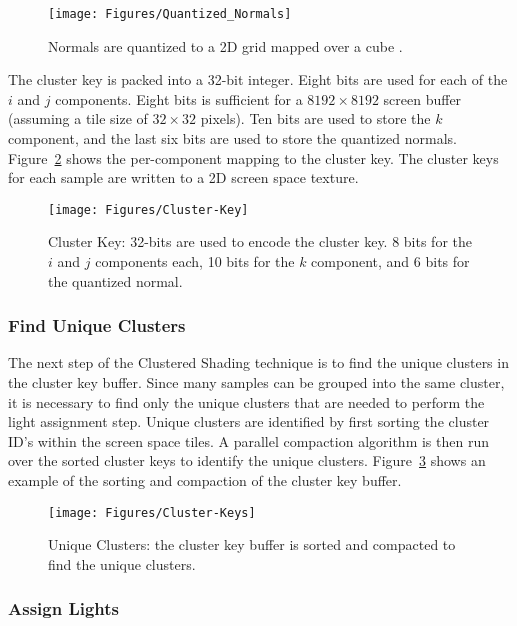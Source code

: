 \begin{figure}[h]
\centering
\texttt{[image: Figures/Quantized\_Normals]}
\decoRule
\caption[Quantized Normals]{Normals are quantized to a 2D grid mapped over a cube \parencite{20_olsson_2012}.}
\label{fig:Quantized_Normals}
\end{figure}

The cluster key is packed into a 32-bit integer. Eight bits are used for each of the $i$ and $j$ components. Eight bits is sufficient for a $8192 \times 8192$ screen buffer (assuming a tile size of $32 \times 32$ pixels). Ten bits are used to store the $k$ component, and the last six bits are used to store the quantized normals. Figure~\ref{fig:Cluster-Key} shows the per-component mapping to the cluster key. The cluster keys for each sample are written to a 2D screen space texture.

\begin{figure}[h]
\centering
\texttt{[image: Figures/Cluster-Key]}
\decoRule
\caption[Cluster Key]{Cluster Key: 32-bits are used to encode the cluster key. 8 bits for the $i$ and $j$ components each, 10 bits for the $k$ component, and 6 bits for the quantized normal.}
\label{fig:Cluster-Key}
\end{figure}

\subsubsection{Find Unique Clusters}

The next step of the Clustered Shading technique is to find the unique clusters in the cluster key buffer. Since many samples can be grouped into the same cluster, it is necessary to find only the unique clusters that are needed to perform the light assignment step. Unique clusters are identified by first sorting the cluster ID's within the screen space tiles. A parallel compaction algorithm is then run over the sorted cluster keys to identify the unique clusters. Figure~\ref{fig:Cluster-Keys} shows an example of the sorting and compaction of the cluster key buffer.

\begin{figure}[h]
\centering
\texttt{[image: Figures/Cluster-Keys]}
\decoRule
\caption[Cluster Keys]{Unique Clusters: the cluster key buffer is sorted and compacted to find the unique clusters.}
\label{fig:Cluster-Keys}
\end{figure}

\subsubsection{Assign Lights}

